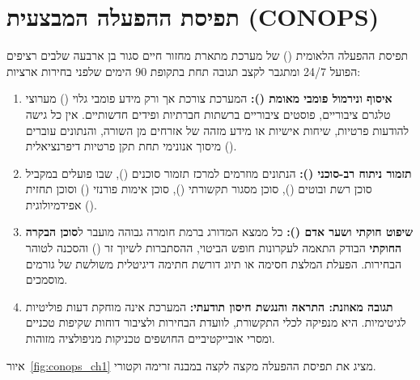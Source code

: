 \section{תפיסת ההפעלה המבצעית (CONOPS)}
תפיסת ההפעלה הלאומית () של מערכת  מתארת מחזור חיים סגור בן ארבעה שלבים רציפים הפועל 24/7 ומתגבר לקצב תגובה תחת  בתקופת 90 הימים שלפני בחירות ארציות:
\begin{enumerate}
    \item \textbf{איסוף ונירמול פומבי מאומת ():} המערכת צורכת אך ורק מידע פומבי גלוי () מערוצי טלגרם ציבוריים, פוסטים ציבוריים ברשתות חברתיות ופידים חדשותיים. אין כל גישה להודעות פרטיות, שיחות אישיות או מידע מזהה של אזרחים מן השורה, והנתונים עוברים מיסוך אנונימי תחת תקן פרטיות דיפרנציאלית ().
    \item \textbf{תזמור ניתוח רב-סוכני ():} הנתונים מוזרמים למרכז תזמור סוכנים (), שבו פועלים במקביל סוכן רשת ובוטים (), סוכן מסגור תקשורתי (), סוכן אימות פורנזי () וסוכן תחזית אפידמיולוגית ().
    \item \textbf{שיפוט חוקתי ושער אדם ():} כל ממצא המדורג ברמת חומרה גבוהה מועבר ל\textbf{סוכן הבקרה החוקתי} הבודק התאמה לעקרונות חופש הביטוי, ההסתברות לשיוך זר () והסכנה לטוהר הבחירות. הפעלת המלצת חסימה או תיוג דורשת חתימה דיגיטלית משולשת של גורמים מוסמכים.
    \item \textbf{תגובה מאוזנת: התראה והנגשת חיסון תודעתי:} המערכת אינה מוחקת דעות פוליטיות לגיטימיות. היא מנפיקה לכלי התקשורת, לוועדת הבחירות ולציבור דוחות שקיפות טכניים ומסרי  אובייקטיביים החושפים טכניקות מניפולציה מזוהות.
\end{enumerate}

איור~\ref{fig:conops_ch1} מציג את תפיסת ההפעלה מקצה לקצה במבנה זרימה וקטורי.

